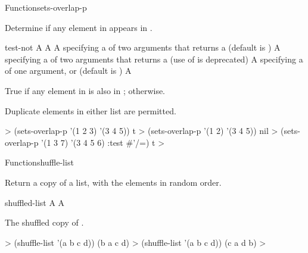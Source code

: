 \documentclass[10pt,twoside,english,pdftex]{article}
\begin{document}
\begin{functiondoc}{Function}{sets-overlap-p}{%
    }

\fnsyntax

\fnpurpose Determine if any element in  appears in 
.

\fnpackage {}

\fnmodule {}

\fnargs
\begin{args}{test-not}
\arg[list-1] A 
\arg[list-2] A 
\arg[test] A  specifying a 
of two arguments that returns a  (default is
)
 A  specifying a
 of two arguments that returns a
 (use of  is deprecated)
\arg[key] A  specifying a 
of one argument, or \nil{} (default is \nil)
\arg[boolean] A 
\end{args}

\fnreturns True if any element in  is also in
; \nil{} otherwise.

\fndescription Duplicate elements in either list are permitted.

\fnexamples
%
\W\supp
\begin{example}
  > (sets-overlap-p '(1 2 3) '(3 4 5))
  t
  > (sets-overlap-p '(1 2) '(3 4 5))
  nil
  > (sets-overlap-p '(1 3 7) '(3 4 5 6) :test #'/=)
  t
  >
\end{example}

\end{functiondoc}


\begin{functiondoc}{Function}{shuffle-list}{
    }
%

\fnsyntax

\fnpurpose Return a copy of a list, with the elements in random order.

\fnpackage {}

\fnmodule {}

\fnargs
\begin{args}{shuffled-list}
\arg[list] A 
 A 
\end{args}

\fnreturns The shuffled copy of .

\fnexamples
%
\W\supp
\begin{example}
  > (shuffle-list '(a b c d))
  (b a c d)
  > (shuffle-list '(a b c d))
  (c a d b)
  >
\end{example}

\end{functiondoc}
\end{document}

